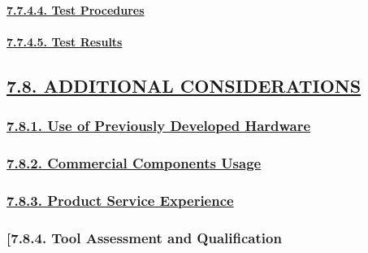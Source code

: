 \documentclass[
]{article}
\begin{document}
\hypertarget{test-procedures}{%
\paragraph{\texorpdfstring{\protect\hyperlink{test-procedures-1}{7.7.4.4.
Test Procedures}}{7.7.4.4. Test Procedures}}\label{test-procedures}}

\hypertarget{test-results}{%
\paragraph{\texorpdfstring{\protect\hyperlink{test-results-1}{7.7.4.5.
Test Results}}{7.7.4.5. Test Results}}\label{test-results}}

\hypertarget{additional-considerations}{%
\subsection{\texorpdfstring{\protect\hyperlink{additional-considerations-1}{7.8.
ADDITIONAL
CONSIDERATIONS}}{7.8. ADDITIONAL CONSIDERATIONS}}\label{additional-considerations}}

\hypertarget{use-of-previously-developed-hardware}{%
\subsubsection{\texorpdfstring{\protect\hyperlink{use-of-previously-developed-hardware-1}{7.8.1.
Use of Previously Developed
Hardware}}{7.8.1. Use of Previously Developed Hardware}}\label{use-of-previously-developed-hardware}}

\hypertarget{commercial-components-usage}{%
\subsubsection{\texorpdfstring{\protect\hyperlink{commercial-components-usage-1}{7.8.2.
Commercial Components
Usage}}{7.8.2. Commercial Components Usage}}\label{commercial-components-usage}}

\hypertarget{product-service-experience}{%
\subsubsection{\texorpdfstring{\protect\hyperlink{product-service-experience-1}{7.8.3.
Product Service
Experience}}{7.8.3. Product Service Experience}}\label{product-service-experience}}

\hypertarget{tool-assessment-and-qualification}{%
\subsubsection{{[}7.8.4. Tool Assessment and
Qualification}\label{tool-assessment-and-qualification}}
\end{document}
